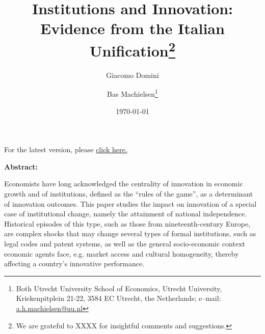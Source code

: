

\title{Institutions and Innovation: \\ Evidence from the Italian Unification\footnote{We are grateful to XXXX for insightful comments and suggestions.}}
\author{Giacomo Domini \and Bas Machielsen\footnote{Both Utrecht University School of Economics, Utrecht University, Kriekenpitplein 21-22, 3584 EC Utrecht, the Netherlands; e--mail: \href{mailto:a.h.machielsen@uu.nl}{a.h.machielsen@uu.nl}}}
\date{\today}



\maketitle

\begin{center}
    For the latest version, please \href{http://link.com/paper.pdf}{click here.}
\end{center}

\begin{center} \textbf{Abstract:} \end{center}


\noindent Economists have long acknowledged the centrality of innovation in economic growth and of institutions, defined as the “rules of the game”, as a determinant of innovation outcomes. This paper studies the impact on innovation of a special case of institutional change, namely the attainment of national independence. Historical episodes of this type, such as those from nineteenth-century Europe, are complex shocks that may change several types of formal institutions, such as legal codes and patent systems, as well as the general socio-economic context economic agents face, e.g. market access and cultural homogeneity, thereby affecting a country's innovative performance.

